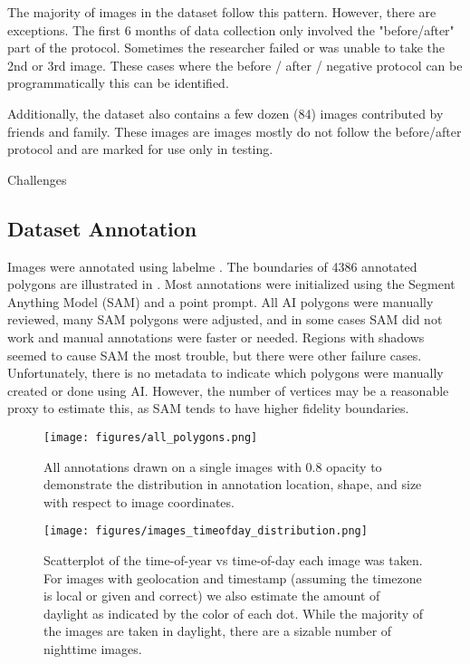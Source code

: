 \documentclass[10pt,twocolumn,letterpaper]{article}
\begin{document}
The majority of images in the dataset follow this pattern.
However, there are exceptions.
The first 6 months of data collection only involved the "before/after" part of the protocol.
Sometimes the researcher failed or was unable to take the 2nd or 3rd image.
These cases where the before / after / negative protocol can be
programmatically this can be identified.

Additionally, the dataset also contains a few dozen (84) images contributed
by friends and family. These images are images mostly do not follow the
before/after protocol and are marked for use only in testing.


Challenges

\subsection{Dataset Annotation}

Images were annotated using labelme \cite{wada_labelmeailabelme_nodate}. 
The boundaries of 4386 annotated polygons are illustrated in .
Most annotations were initialized using the Segment Anything Model (SAM)
\cite{kirillov_segment_2023} and a point prompt. 
All AI polygons were manually reviewed, many SAM polygons were adjusted, and in
some cases SAM did not work and manual annotations were faster or needed.
Regions with shadows seemed to cause SAM the most trouble, but there were other
failure cases. Unfortunately, there is no metadata to indicate which polygons
were manually created or done using AI.  However, the number of vertices may be
a reasonable proxy to estimate this, as SAM tends to have higher fidelity
boundaries. 


\begin{figure}[h]
\centering
\texttt{[image: figures/all\_polygons.png]}
\caption[]{
    All annotations drawn on a single images with 0.8 opacity to demonstrate
    the distribution in annotation location, shape, and size with respect to
    image coordinates.
}
\label{fig:AllPolygons}
\end{figure}

\begin{figure}[h]
\centering
\texttt{[image: figures/images\_timeofday\_distribution.png]}
\caption[]{
    Scatterplot of the time-of-year vs time-of-day each image was taken.  For
    images with geolocation and timestamp (assuming the timezone is local or
    given and correct) we also estimate the amount of daylight as indicated by
    the color of each dot. While the majority of the images are taken in
    daylight, there are a sizable number of nighttime images.
}
\label{fig:TimeOfDayDistribution}
\end{figure}
\end{document}
